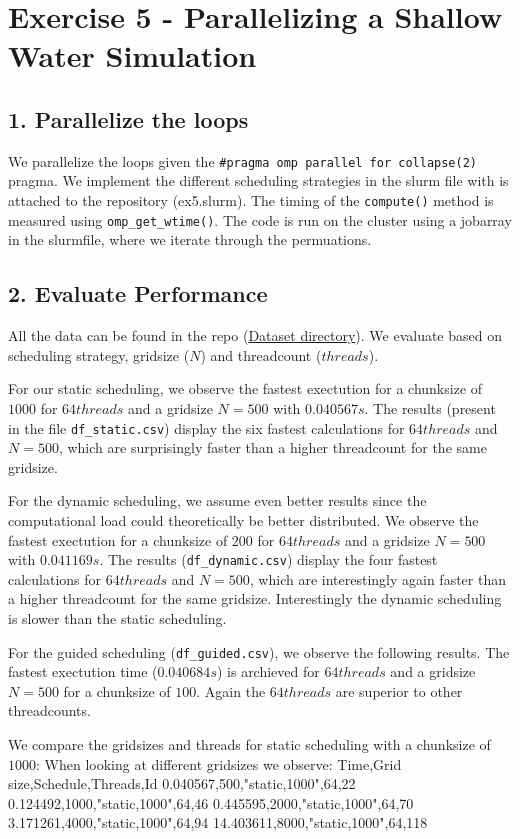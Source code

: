 \documentclass[a4paper,10pt]{article}
\begin{document}
\section{Exercise 5 - Parallelizing a Shallow Water Simulation}
\subsection{1. Parallelize the loops}
We parallelize the loops given the \verb|#pragma omp parallel for collapse(2)| pragma. 
We implement the different scheduling strategies in the slurm file with is attached to the repository (ex5.slurm).
The timing of the \verb|compute()| method is measured using \verb|omp_get_wtime()|.
The code is run on the cluster using a jobarray in the slurmfile, where we iterate through the permuations.

\subsection{2. Evaluate Performance}
All the data can be found in the repo (\href{https://github.com/paulmyr/DD2356-MethodsHPC/tree/master/3_open_mp/exercise5/data}{Dataset directory}).
We evaluate based on scheduling strategy, gridsize ($N$) and threadcount ($threads$).

For our static scheduling, we observe the fastest exectution for a chunksize of $ 1000 $ for $64 threads$ and a gridsize $N=500$ with $0.040567 s$.
The results (present in the file \verb|df_static.csv|) display the six fastest calculations for $64 threads$ and $N=500$, which are surprisingly faster than a higher threadcount for the same gridsize.

For the dynamic scheduling, we assume even better results since the computational load could theoretically be better distributed. 
We observe the fastest exectution for a chunksize of $ 200 $ for $64 threads$ and a gridsize $N=500$ with $0.041169 s$.
The results (\verb|df_dynamic.csv|) display the four fastest calculations for $64 threads$ and $N=500$, which are interestingly again faster than a higher threadcount for the same gridsize.
Interestingly the dynamic scheduling is slower than the static scheduling.

For the guided scheduling (\verb|df_guided.csv|), we observe the following results. The fastest exectution time ($0.040684 s$) is archieved for $64 threads$ and a gridsize $N=500$ for a chunksize of $100$.
Again the $64 threads$ are superior to other threadcounts.

We compare the gridsizes and threads for static scheduling with a chunksize of $1000$:
When looking at different gridsizes we observe:
Time,Grid size,Schedule,Threads,Id
0.040567,500,"static,1000",64,22
0.124492,1000,"static,1000",64,46
0.445595,2000,"static,1000",64,70
3.171261,4000,"static,1000",64,94
14.403611,8000,"static,1000",64,118
\end{document}
